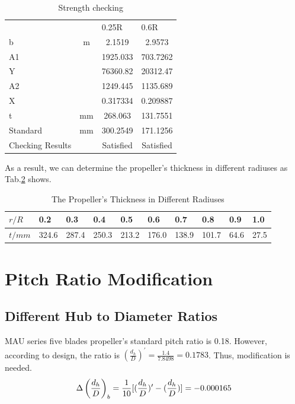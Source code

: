 \documentclass[a4paper,UTF8]{article}
\begin{document}
\begin{table}[!htbp]
	\centering
	\begin{tabular}{p{3cm}ccc}
		\hline
		    &  & \multicolumn{1}{l}{0.25R} & \multicolumn{1}{l}{0.6R} \\
		b   & 	m	 & 2.1519 & 2.9573 \\
		A1    &       & 1925.033 & 703.7262 \\
		Y     &       & 76360.82 & 20312.47 \\
		A2    &       & 1249.445 & 1135.689 \\
		X     &       & 0.317334 & 0.209887 \\
		t     &	mm  & 268.063 & 131.7551 \\
		Standard & mm & 300.2549 & 171.1256 \\
		Checking Results  &       & Satisfied & Satisfied \\
		\hline
	\end{tabular}
	\caption{Strength checking}
	\label{tab:strcheck}
\end{table}
As a result, we can determine the propeller’s thickness in different radiuses as Tab.\ref{tab:jiangyehoudu} shows.
\begin{table}[!htbp]
	\centering
	\begin{tabular}{llllllllll}
		\hline
		$r/R$  & 0.2        & 0.3        & 0.4        & 0.5        & 0.6        & 0.7        & 0.8        & 0.9        & 1.0       \\
		\hline
		$t/mm$ & 324.6  & 287.4  & 250.3  & 213.2  & 176.0  & 138.9  & 101.7  & 64.6  & 27.5  \\
		\hline
	\end{tabular}
	\caption{The Propeller’s Thickness in Different Radiuses}
	\label{tab:jiangyehoudu}
\end{table}

\section{Pitch Ratio Modification}
\subsection{Different Hub to Diameter Ratios}
MAU series five blades propeller's standard pitch ratio is 0.18. However, according to design, the ratio is $(\frac{d_h}{D})^\prime=\frac{1.4}{7.8498}=0.1783$. Thus, modification is needed.
\begin{equation}
\centering
\Delta\left(\frac{d_h}{D}\right)_b=\frac{1}{10}[(\frac{d_h}{D})^\prime-(\frac{d_h}{D})]=-0.000165
\end{equation}
\end{document}
